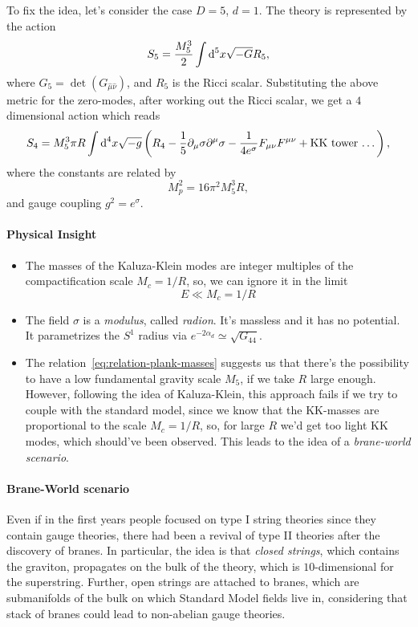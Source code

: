 To fix the idea, let's consider the case $D=5$, $d=1$. The theory is represented by the action
\begin{equation}
    S_5 = \frac{M^3_5}{2} \int \mathop{}\!\mathrm{d}^5 x \sqrt{-G} R_5,
\end{equation}
where $G_5 = \det(G_{\hat{\mu} \hat{\nu}})$, and $R_5$ is the Ricci scalar. Substituting the above metric for the zero-modes, after working out the Ricci scalar, we get a $4$ dimensional action which reads
\begin{equation}
    S_4 = M^3_5 \pi R \int {\mathop{}\!\mathrm{d}}^4 x \sqrt{-g} \left( R_4 -\frac{1}{5} \partial_\mu \sigma \partial^\mu \sigma - \frac{1}{4 e^\sigma} F_{\mu\nu} F^{\mu\nu} + \textup{KK tower \dots} \right),
\end{equation}
where the constants are related by
\begin{equation}\label{eq:relation-plank-masses}
    M^2_p = 16 \pi^2 M^3_5 R,
\end{equation}
and gauge coupling $g^2 = e^\sigma$.

\paragraph{Physical Insight}
\begin{itemize}
    \item The masses of the Kaluza-Klein modes are integer multiples of the compactification scale $M_c = 1 / R$, so, we can ignore it in the limit
    \begin{equation}
        E \ll M_c = 1/R
    \end{equation}
    \item The field $\sigma$ is a \emph{modulus}, called \emph{radion}. It's massless and it has no potential. It parametrizes the $S^1$ radius via $e^{-2\alpha_d} \simeq \sqrt{G_{44}}$.
    \item The relation~\eqref{eq:relation-plank-masses} suggests us that there's the possibility to have a low fundamental gravity scale $M_5$, if we take $R$ large enough. However, following the idea of Kaluza-Klein, this approach fails if we try to couple with the standard model, since we know that the KK-masses are proportional to the scale $M_c = 1/R$, so, for large $R$ we'd get too light KK modes, which should've been observed. This leads to the idea of a \emph{brane-world scenario}.
\end{itemize}

\paragraph{Brane-World scenario}
Even if in the first years people focused on type I string theories since they contain gauge theories, there had been a revival of type II theories after the discovery of branes. In particular, the idea is that \emph{closed strings}, which contains the graviton, propagates on the bulk of the theory, which is $10$-dimensional for the superstring. Further, open strings are attached to branes, which are submanifolds of the bulk on which Standard Model fields live in, considering that stack of branes could lead to non-abelian gauge theories. 

